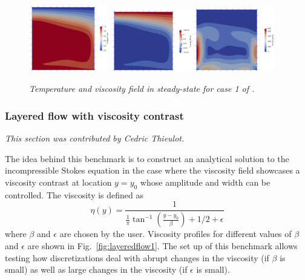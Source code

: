 \documentclass{article}
\begin{document}
\begin{figure}
  \begin{center}
    \includegraphics[width=0.31\textwidth]{cookbooks/benchmarks/tosi/Case1_6_T.png}
    \includegraphics[width=0.31\textwidth]{cookbooks/benchmarks/tosi/Case1_6_visc.png}
    \includegraphics[width=0.31\textwidth]{cookbooks/benchmarks/tosi/Case1_6_vel.png}
  \end{center}
  \caption{\it Temperature and viscosity field in steady-state for case 1 of \cite{T15}.}
  \label{fig:tosi-benchmark-results}
\end{figure}

\subsubsection{Layered flow with viscosity contrast}
\label{sec:benchmark-layeredflow}

\textit{This section was contributed by Cedric Thieulot.}

The idea behind this benchmark is to construct an analytical solution to the incompressible
Stokes equation in the case where the viscosity field showcases a 
viscosity contrast at location $y=y_0$ whose amplitude and width can be controlled. 
The viscosity is defined as
\[
\eta(y)=\frac{1}{\frac{1}{\pi} \tan^{-1} (\frac{y-y_0}{\beta} ) + 1/2 + \epsilon}
\]
where $\beta$ and $\epsilon$ are chosen by the user. 
Viscosity profiles for different values of $\beta$ and $\epsilon$ are
shown in Fig.~\ref{fig:layeredflow1}. The set up of this benchmark
allows testing how discretizations deal with abrupt changes in the
viscosity (if $\beta$ is small) as well as large changes in the
viscosity (if $\epsilon$ is small).
\end{document}
